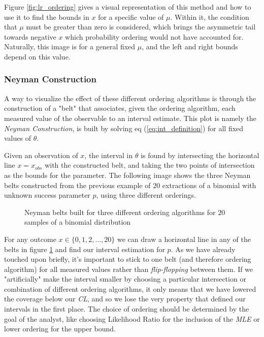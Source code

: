 Figure \ref{fig:lr_ordering} gives a visual representation of this method and how to use it to find the bounds in $x$ for a specific value of $\mu$. Within it, the condition that $\mu$ must be greater than zero is considered, which brings the asymmetric tail towards negative $x$ which probability ordering would not have accounted for. Naturally, this image is for a general fixed $\mu$, and the left and right bounds depend on this value.

\subsubsection{Neyman Construction}
A way to visualize the effect of these different ordering algorithms is through the construction of a "belt" that associates, given the ordering algorithm, each measured value of the observable to an interval estimate. This plot is namely the \emph{Neyman Construction}, is built by solving eq (\ref{eq:int_definition}) for all fixed values of $\theta$. 

Given an observation of $x$, the interval in $\theta$ is found by intersecting the horizontal line $x=x_{obs}$ with the constructed belt, and taking the two points of intersection as the bounds for the parameter. The following image shows the three Neyman belts constructed from the previous example of $20$ extractions of a binomial with unknown success parameter $p$, using three different orderings. 

\begin{figure}[H]
	\centering
	
	\caption{Neyman belts built for three different ordering algorithms for $20$ samples of a binomial distribution}
	\label{fig:binomial_Neyman_belts}
\end{figure}

For any outcome $x\in\{0,1,2,\dots,20\}$ we can draw a horizontal line in any of the belts in figure \ref{fig:binomial_Neyman_belts} and find our interval estimation for $p$. As we have already touched upon briefly, it's important to stick to one belt (and therefore ordering algorithm) for all measured values rather than \emph{flip-flopping} between them. If we "artificially" make the interval smaller by choosing a particular intersection or combination of different ordering algorithms, it only means that we have lowered the coverage below our \emph{CL}, and so we lose the very property that defined our intervals in the first place. The choice of ordering should be determined by the goal of the analyst, like choosing Likelihood Ratio for the inclusion of the \emph{MLE} or lower ordering for the upper bound.


